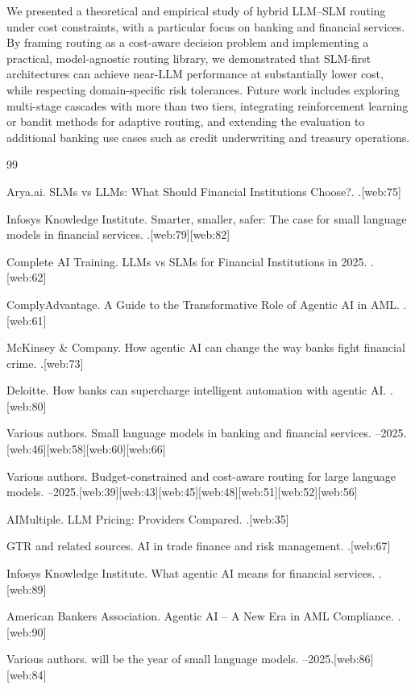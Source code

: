 \documentclass[11pt]{article}
\begin{document}
We presented a theoretical and empirical study of hybrid LLM--SLM routing under cost constraints, with a particular focus on banking and financial services. By framing routing as a cost-aware decision problem and implementing a practical, model-agnostic routing library, we demonstrated that SLM-first architectures can achieve near-LLM performance at substantially lower cost, while respecting domain-specific risk tolerances. Future work includes exploring multi-stage cascades with more than two tiers, integrating reinforcement learning or bandit methods for adaptive routing, and extending the evaluation to additional banking use cases such as credit underwriting and treasury operations.


\begin{thebibliography}{99}

Arya.ai.
\newblock SLMs vs LLMs: What Should Financial Institutions Choose?.
.[web:75]

Infosys Knowledge Institute.
\newblock Smarter, smaller, safer: The case for small language models in financial services.
.[web:79][web:82]

Complete AI Training.
\newblock LLMs vs SLMs for Financial Institutions in 2025.
.[web:62]

ComplyAdvantage.
\newblock A Guide to the Transformative Role of Agentic AI in AML.
.[web:61]

McKinsey \& Company.
\newblock How agentic AI can change the way banks fight financial crime.
.[web:73]

Deloitte.
\newblock How banks can supercharge intelligent automation with agentic AI.
.[web:80]

Various authors.
\newblock Small language models in banking and financial services.
--2025.[web:46][web:58][web:60][web:66]

Various authors.
\newblock Budget-constrained and cost-aware routing for large language models.
--2025.[web:39][web:43][web:45][web:48][web:51][web:52][web:56]

AIMultiple.
\newblock LLM Pricing: Providers Compared.
.[web:35]

GTR and related sources.
\newblock AI in trade finance and risk management.
.[web:67]

Infosys Knowledge Institute.
\newblock What agentic AI means for financial services.
.[web:89]

American Bankers Association.
\newblock Agentic AI -- A New Era in AML Compliance.
.[web:90]

Various authors.
 will be the year of small language models.
--2025.[web:86][web:84]

\end{thebibliography}
\end{document}
